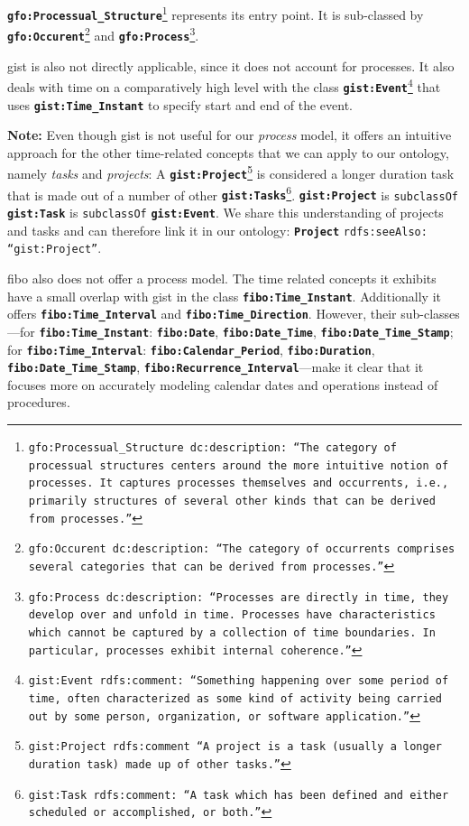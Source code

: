 \documentclass[a4paper, DIV=13, BCOR=0cm]{scrbook}
\newcommand{\class}[1]{\texttt{\textbf{#1}}}
\newcommand{\relation}[1]{\texttt{#1}}
\newcommand{\foottt}[1]{\footnote{\texttt{#1}}}
\begin{document}
	\class{gfo:Processual\_Structure}\foottt{gfo:Processual\_Structure dc:description: \enquote{The category of processual structures centers around the more intuitive notion of processes. It captures processes themselves and occurrents, i.e., primarily structures of several other kinds that can be derived from processes.}}
%
represents its entry point. It is sub-classed by %
	\class{gfo:Occurent}\foottt{gfo:Occurent dc:description: \enquote{The category of occurrents comprises several categories that can be derived from processes.}}
%
and %
	\class{gfo:Process}\foottt{gfo:Process dc:description: \enquote{Processes are directly in time, they develop over and unfold in time. Processes have characteristics which cannot be captured by a collection of time boundaries. In particular, processes exhibit internal coherence.}}.

\gls{gist} is also not directly applicable, since it does not account for processes. It also deals with time on a comparatively high level with the class %
	\class{gist:Event}\foottt{gist:Event rdfs:comment: \enquote{Something happening over some period of time, often characterized as some kind of activity being carried out by some person, organization, or software application.}} %
that uses \class{gist:Time\_Instant} to specify start and end of the event. 

\begin{mdframed}
	\textbf{Note:} Even though \gls{gist} is not useful for our \textit{process} model, it offers an intuitive approach for the other time-related concepts that we can apply to our ontology, namely \textit{tasks} and \textit{projects}: A %
	\class{gist:Project}\foottt{gist:Project rdfs:comment \enquote{A project is a task (usually a longer duration task) made up of other tasks.}} %
	is considered a longer duration task that is made out of a number of other %
	\class{gist:Tasks}\foottt{gist:Task rdfs:comment: \enquote{A task which has been defined and either scheduled or accomplished, or both.}}. %
	\class{gist:Project} is \relation{subclassOf} \class{gist:Task} is \relation{subclassOf} \class{gist:Event}. We share this understanding of projects and tasks and can therefore link it in our ontology: \class{Project} \relation{rdfs:seeAlso: \enquote{gist:Project}}.
\end{mdframed} 

\gls{fibo} also does not offer a process model. The time related concepts it exhibits have a small overlap with \gls{gist} in the class \class{fibo:Time\_Instant}. Additionally it offers \class{fibo:Time\_Interval} and \class{fibo:Time\_Direction}. However, their sub-classes---for \class{fibo:Time\_Instant}: \class{fibo:Date}, \class{fibo:Date\_Time}, \class{fibo:Date\_Time\_Stamp}; for \class{fibo:Time\_Interval}: \class{fibo:Calendar\_Period}, \class{fibo:Duration}, \class{fibo:Date\_Time\_Stamp}, \class{fibo:Recurrence\_Interval}---make it clear that it focuses more on accurately modeling calendar dates and operations instead of procedures.
\end{document}
